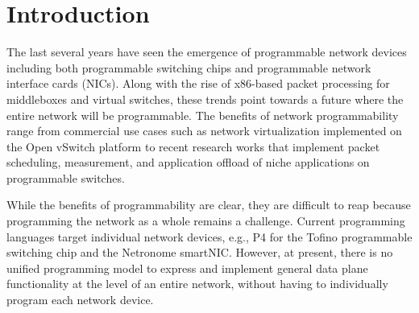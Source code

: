 \section{Introduction}
The last several years have seen the emergence of programmable network devices
including both programmable switching chips and programmable network interface
cards (NICs). Along with the rise of x86-based packet processing for
middleboxes and virtual switches, these trends point towards a future where the
entire network will be programmable. The benefits of network programmability
range from commercial use cases such as network virtualization implemented on
the Open vSwitch platform to recent research works that
implement packet scheduling, measurement, and application offload of niche
applications on programmable switches.

While the benefits of programmability are clear, they are difficult to reap
because programming the network as a whole remains a challenge. Current
programming languages target individual network devices, e.g., P4 for the
Tofino programmable switching chip and the Netronome smartNIC. However,
at present, there is no unified programming model to express and implement
general data plane functionality at the level of an entire network, without
having to individually program each network device.

